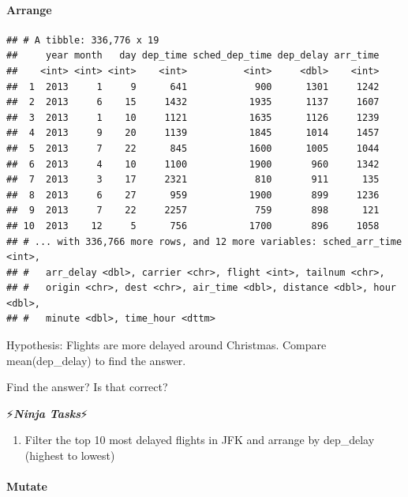 \documentclass[]{article}
\newenvironment{Shaded}{\begin{snugshade}}{\end{snugshade}}
\newcommand{\KeywordTok}[1]{\textcolor[rgb]{0.13,0.29,0.53}{\textbf{#1}}}
\newcommand{\StringTok}[1]{\textcolor[rgb]{0.31,0.60,0.02}{#1}}
\newcommand{\OperatorTok}[1]{\textcolor[rgb]{0.81,0.36,0.00}{\textbf{#1}}}
\newcommand{\NormalTok}[1]{#1}
\providecommand{\tightlist}{%
  \setlength{\itemsep}{0pt}\setlength{\parskip}{0pt}}
\let\oldparagraph\paragraph
\renewcommand{\paragraph}[1]{\oldparagraph{#1}\mbox{}}
\begin{document}
\paragraph{Arrange}\label{arrange}

\begin{Shaded}
\end{Shaded}

\begin{verbatim}
## # A tibble: 336,776 x 19
##     year month   day dep_time sched_dep_time dep_delay arr_time
##    <int> <int> <int>    <int>          <int>     <dbl>    <int>
##  1  2013     1     9      641            900      1301     1242
##  2  2013     6    15     1432           1935      1137     1607
##  3  2013     1    10     1121           1635      1126     1239
##  4  2013     9    20     1139           1845      1014     1457
##  5  2013     7    22      845           1600      1005     1044
##  6  2013     4    10     1100           1900       960     1342
##  7  2013     3    17     2321            810       911      135
##  8  2013     6    27      959           1900       899     1236
##  9  2013     7    22     2257            759       898      121
## 10  2013    12     5      756           1700       896     1058
## # ... with 336,766 more rows, and 12 more variables: sched_arr_time <int>,
## #   arr_delay <dbl>, carrier <chr>, flight <int>, tailnum <chr>,
## #   origin <chr>, dest <chr>, air_time <dbl>, distance <dbl>, hour <dbl>,
## #   minute <dbl>, time_hour <dttm>
\end{verbatim}

Hypothesis: Flights are more delayed around Christmas. Compare
mean(dep\_delay) to find the answer.

Find the answer? Is that correct?

⚡\textbf{\emph{Ninja Tasks}}⚡

\begin{enumerate}
\def\labelenumi{\arabic{enumi}.}
\tightlist
\item
  Filter the top 10 most delayed flights in JFK and arrange by
  dep\_delay (highest to lowest)
\end{enumerate}

\paragraph{Mutate}\label{mutate}
\end{document}
